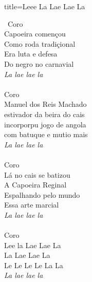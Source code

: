 \documentclass[fontsize=14pt, paper=a4, twoside, DIV=20]{scrreprt} %
\begin{document}
\begin{multicols*}{2}
\begin{song}{title={Leee La Lae Lae La}}
\begin{verse*}
            \
            Coro\\
            Capoeira començou\\
            Como roda tradiçional\\
            Era luta e defesa\\
            Do negro no carnavial\\
            \textit{La lae lae la}\\
\\
            Coro\\
            Manuel dos Reis Machado\\
            estivador da beira do cais\\
            incorporpu jogo de angola\\
            com batuque e mutio mais\\
            \textit{La lae lae la}\\
\\
            Coro\\
            Lá no cais se batizou\\
            A Capoeira Reginal\\
            Espalhando pelo mundo\\
            Essa arte marcial\\
            \textit{La lae lae la}\\
\\
            Coro\\
            Lee la Lae Lae La\\
            La Lae Lae La\\
            Le Le Le Le La La\\
            \textit{La lae lae la}\\
        \end{verse*}
\end{song}



\end{multicols*}
\end{document}
